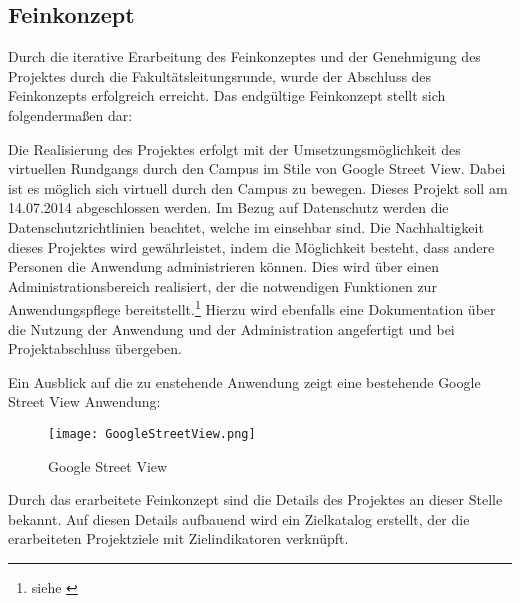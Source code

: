 \subsection{Feinkonzept}
\label{sec:Feinkonzept}

Durch die iterative Erarbeitung des Feinkonzeptes und der Genehmigung des
Projektes durch die Fakultätsleitungsrunde, wurde der Abschluss des Feinkonzepts
erfolgreich erreicht. Das endgültige Feinkonzept stellt sich folgendermaßen dar:

Die Realisierung des Projektes erfolgt mit der Umsetzungsmöglichkeit des
virtuellen Rundgangs durch den Campus im Stile von Google Street View. Dabei ist
es möglich sich virtuell durch den Campus zu bewegen. Dieses Projekt soll am
14.07.2014 abgeschlossen werden. Im Bezug auf Datenschutz werden die
Datenschutzrichtlinien beachtet, welche im 
einsehbar sind. Die Nachhaltigkeit dieses Projektes wird gewährleistet, indem die Möglichkeit
besteht, dass andere Personen die Anwendung administrieren können. Dies wird über
einen Administrationsbereich realisiert, der die notwendigen Funktionen zur
Anwendungspflege bereitstellt.\footnote{siehe \citet{lastenheft2013}} Hierzu
wird ebenfalls eine Dokumentation über die Nutzung der Anwendung und der
Administration angefertigt und bei Projektabschluss übergeben.

Ein Ausblick auf die zu enstehende Anwendung zeigt eine bestehende 
Google Street View Anwendung:

\begin{figure}[htb] 
\centering
\texttt{[image: GoogleStreetView.png]}
\caption[Google Street View]{Google Street View\protect\footnotemark}
\label{fig:GoogleStreetView}
\end{figure}

Durch das erarbeitete Feinkonzept sind die Details des Projektes an dieser Stelle bekannt.
Auf diesen Details aufbauend wird ein Zielkatalog erstellt, der die erarbeiteten Projektziele
mit Zielindikatoren verknüpft.